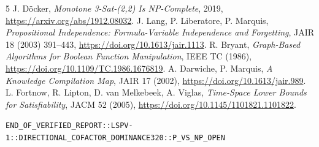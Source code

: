 \documentclass[11pt]{article}
\begin{document}
\begin{thebibliography}{5}
 J. D\"ocker, \emph{Monotone 3-Sat-(2,2) Is NP-Complete}, 2019, \url{https://arxiv.org/abs/1912.08032}.
 J. Lang, P. Liberatore, P. Marquis, \emph{Propositional Independence: Formula-Variable Independence and Forgetting}, JAIR 18 (2003) 391--443, \url{https://doi.org/10.1613/jair.1113}.
 R. Bryant, \emph{Graph-Based Algorithms for Boolean Function Manipulation}, IEEE TC (1986), \url{https://doi.org/10.1109/TC.1986.1676819}.
 A. Darwiche, P. Marquis, \emph{A Knowledge Compilation Map}, JAIR 17 (2002), \url{https://doi.org/10.1613/jair.989}.
 L. Fortnow, R. Lipton, D. van Melkebeek, A. Viglas, \emph{Time-Space Lower Bounds for Satisfiability}, JACM 52 (2005), \url{https://doi.org/10.1145/1101821.1101822}.
\end{thebibliography}
\noindent\texttt{END\_OF\_VERIFIED\_REPORT::LSPV-1::DIRECTIONAL\_COFACTOR\_DOMINANCE320::P\_VS\_NP\_OPEN}
\end{document}
